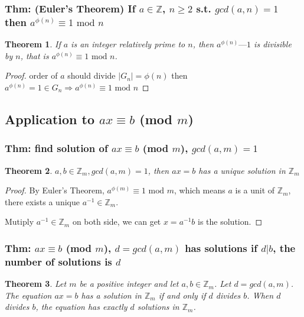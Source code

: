 \documentclass[11pt,a4paper]{article}
\newtheorem{theorem}{Theorem}
\begin{document}
\subsubsection{Thm: (Euler's Theorem) If $a\in \mathbb{Z}$, $n\geq 2$ s.t. $gcd(a,n)=1$ then $a^{\phi(n)}\equiv 1 \text{ mod }n$}
\begin{theorem}
    If $a$ is an integer relatively prime to $n$, then $a^{\phi(n)} — 1$ is divisible
    by $n$, that is $a^{\phi(n)}\equiv 1 \text{ mod }n$.
\end{theorem}
\begin{proof}
    order of $a$ should divide $|G_n|=\phi(n)$ then $a^{\phi(n)}=1\in G_n \Rightarrow a^{\phi(n)}\equiv 1 \text{ mod }n$
\end{proof}

\subsection{Application to $ax \equiv b$ (mod $m$)}
\subsubsection{Thm: find solution of $ax \equiv b$ (mod $m$), $gcd(a,m)=1$}
\begin{theorem}
    $a,b\in \mathbb{Z}_m, gcd(a,m)=1$, then $ax=b$ has a unique solution in $\mathbb{Z}_m$
\end{theorem}
\begin{proof}
By Euler's Theorem, $a^{\phi(m)}\equiv 1 \text{ mod }m$, which means $a$ is a unit of $\mathbb{Z}_m$, there exists a unique $a^{-1}\in \mathbb{Z}_m$.

Mutiply $a^{-1}\in \mathbb{Z}_m$ on both side, we can get $x=a^{-1}b$ is the solution.
\end{proof}

\subsubsection{Thm: $ax \equiv b$ (mod $m$), $d=gcd(a,m)$ has solutions if $d|b$, the number of solutions is $d$}
\begin{theorem}
    Let $m$ be a positive integer and let $a, b \in \mathbb{Z}_m$. Let $d=gcd(a,m)$. The equation $ax = b$ has a solution in $\mathbb{Z}_m$ if and only if $d$ divides $b$. When $d$ divides $b$, the equation has exactly $d$ solutions in $\mathbb{Z}_m$.
\end{theorem}
\end{document}
